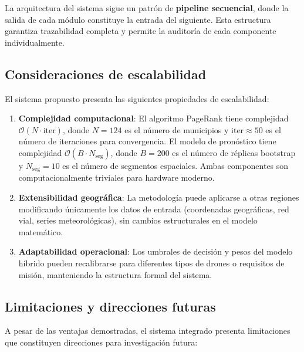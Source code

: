 \documentclass[
  spanish,
  us-letterpaper,
]{scrreprt}
\numberwithin{equation}{section}
\begin{document}
La arquitectura del sistema sigue un patrón de \textbf{pipeline
secuencial}, donde la salida de cada módulo constituye la entrada del
siguiente. Esta estructura garantiza trazabilidad completa y permite la
auditoría de cada componente individualmente.

\subsection{Consideraciones de
escalabilidad}\label{consideraciones-de-escalabilidad}

El sistema propuesto presenta las siguientes propiedades de
escalabilidad:

\begin{enumerate}
\def\labelenumi{\arabic{enumi}.}
\item
  \textbf{Complejidad computacional}: El algoritmo PageRank tiene
  complejidad \(\mathcal{O}(N \cdot \text{iter})\), donde \(N = 124\) es
  el número de municipios y \(\text{iter} \approx 50\) es el número de
  iteraciones para convergencia. El modelo de pronóstico tiene
  complejidad \(\mathcal{O}(B \cdot N_{\text{seg}})\), donde \(B = 200\)
  es el número de réplicas bootstrap y \(N_{\text{seg}} = 10\) es el
  número de segmentos espaciales. Ambas componentes son
  computacionalmente triviales para hardware moderno.
\item
  \textbf{Extensibilidad geográfica}: La metodología puede aplicarse a
  otras regiones modificando únicamente los datos de entrada
  (coordenadas geográficas, red vial, series meteorológicas), sin
  cambios estructurales en el modelo matemático.
\item
  \textbf{Adaptabilidad operacional}: Los umbrales de decisión y pesos
  del modelo híbrido pueden recalibrarse para diferentes tipos de drones
  o requisitos de misión, manteniendo la estructura formal del sistema.
\end{enumerate}

\subsection{Limitaciones y direcciones
futuras}\label{limitaciones-y-direcciones-futuras}

A pesar de las ventajas demostradas, el sistema integrado presenta
limitaciones que constituyen direcciones para investigación futura:
\end{document}

